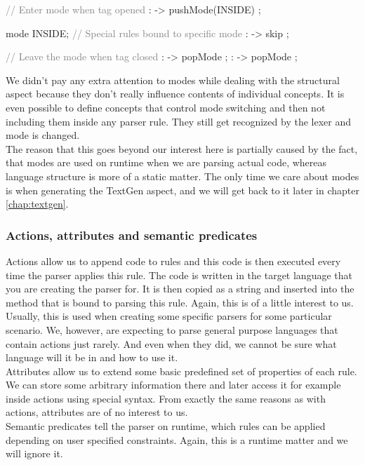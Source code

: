 \begin{antlr}
	\textcolor{gray}{// Enter mode when tag opened}
	        :   \literal{<}       -> pushMode(INSIDE) ;

	mode INSIDE;
	\textcolor{gray}{// Special rules bound to specific mode}
	           :    -> skip ;

	\textcolor{gray}{// Leave the mode when tag closed}
	       :   \literal{>}       -> popMode ;
	 :   \literal{/>}      -> popMode ;
\end{antlr}

We didn't pay any extra attention to modes while dealing with the structural aspect because they don't really influence contents of individual concepts.
It is even possible to define concepts that control mode switching and then not including them inside any parser rule.
They still get recognized by the lexer and mode is changed.
\\

The reason that this goes beyond our interest here is partially caused by the fact, that modes are used on runtime when we are parsing actual code, whereas language structure is more of a static matter.
The only time we care about modes is when generating the TextGen aspect, and we will get back to it later in chapter \ref{chap:textgen}.

\subsubsection{Actions, attributes and semantic predicates}

Actions allow us to append code to rules and this code is then executed every time the parser applies this rule.
The code is written in the target language that you are creating the parser for.
It is then copied as a string and inserted into the method that is bound to parsing this rule.
Again, this is of a little interest to us.
Usually, this is used when creating some specific parsers for some particular scenario.
We, however, are expecting to parse general purpose languages that contain actions just rarely.
And even when they did, we cannot be sure what language will it be in and how to use it.
\\

Attributes allow us to extend some basic predefined set of properties of each rule.
We can store some arbitrary information there and later access it for example inside actions using special syntax.
From exactly the same reasons as with actions, attributes are of no interest to us.
\\

Semantic predicates tell the parser on runtime, which rules can be applied depending on user specified constraints.
Again, this is a runtime matter and we will ignore it.
